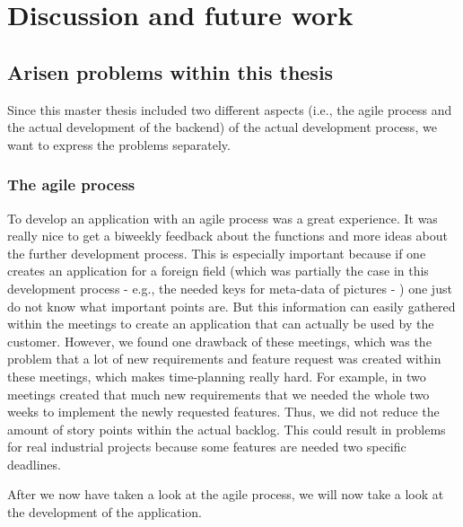 \chapter[Discussion and future work]{Discussion and future work}
\section{Arisen problems within this thesis}
Since this master thesis included two different aspects (i.e., the agile process and the actual development of the backend) of the actual development process, we want to express the problems separately. 

\subsection{The agile process}
To develop an application with an agile process was a great experience. It was really nice to get a biweekly feedback about the functions and more ideas about the further development process. This is especially important because if one creates an application for a foreign field (which was partially the case in this development process - e.g., the needed keys for meta-data of pictures - ) one just do not know what important points are. But this information can easily gathered within the meetings to create an application that can actually be used by the customer. 
However, we found one drawback of these meetings, which was the problem that a lot of new requirements and feature request was created within these meetings, which makes time-planning really hard. For example, in two meetings created that much new requirements that we needed the whole two weeks to implement the newly requested features. Thus, we did not reduce the amount of story points within the actual backlog. This could result in problems for real industrial projects because some features are needed two specific deadlines.

After we now have taken a look at the agile process, we will now take a look at the development of the application.   

